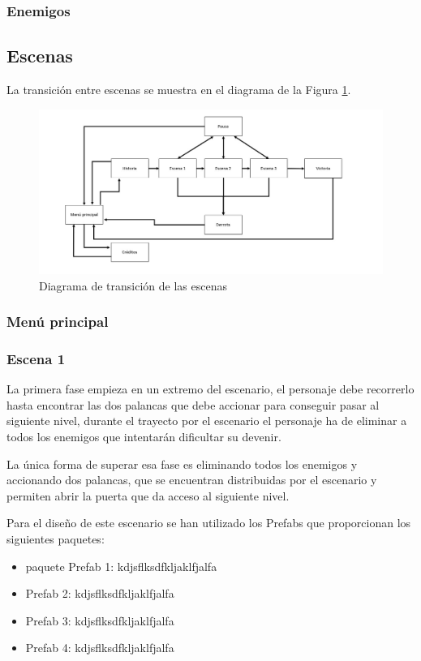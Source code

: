 \subsubsection{Enemigos}

\subsection{Escenas}

La transición entre escenas se muestra en el diagrama de la Figura \ref{fig:TrasicionEscenas3D}. 

\begin{figure}[H]
	\centering
	\includegraphics[scale=0.35]{imagenes/transicionEscenas.jpeg}
	\caption{\label{fig:TrasicionEscenas3D}Diagrama de transición de las escenas}
\end{figure}

\subsubsection{Menú principal}


\subsubsection{Escena 1}
La primera fase empieza en un extremo del escenario, el personaje debe recorrerlo hasta encontrar las dos palancas que debe accionar para conseguir pasar al siguiente nivel, durante el trayecto por el escenario el personaje ha de eliminar a todos los enemigos que intentarán dificultar su devenir.

La única forma de superar esa fase es eliminando todos los enemigos y accionando dos palancas, que se encuentran distribuidas por el escenario y permiten abrir la puerta que da acceso al siguiente nivel.

Para el diseño de este escenario se han utilizado los Prefabs que proporcionan los siguientes paquetes:
\begin{itemize}
	\item paquete Prefab 1: kdjsflksdfkljaklfjalfa
	\item Prefab 2: kdjsflksdfkljaklfjalfa
	\item Prefab 3: kdjsflksdfkljaklfjalfa
	\item Prefab 4: kdjsflksdfkljaklfjalfa
\end{itemize}

